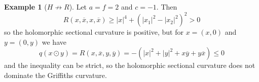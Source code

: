 \documentclass[10pt,a4paper]{amsart}
\theoremstyle{definition}
\newtheorem{exam}[theo]{Example}
\def\ov#1{\overline{#1}}
\begin{document}
\begin{exam}[$H \not\to R$]
Let $a = f = 2$ and $c = -1$.
Then
$$
R(x, \ov x, x, \ov x)
\geq |x|^4 + (|x_1|^2 - |x_2|^2)^2 > 0
$$
so the holomorphic sectional curvature is positive, but
for $x = (x,0)$ and $y = (0,y)$ we have
$$
q(x \odot y)
= R(x, \ov x, y, \ov y)
= - (|x|^2 + |y|^2 + x \ov y + y \ov x)
\leq 0
$$
and the inequality can be strict, so the holomorphic sectional curvature does
not dominate the Griffiths curvature.
\end{exam}




\end{document}
